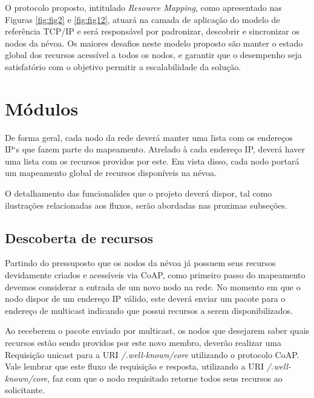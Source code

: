 O protocolo proposto, intitulado \textit{Resource Mapping}, como apresentado nas Figuras \ref{fig:fig2} e \ref{fig:fig12}, atuará na camada de aplicação do modelo de referência TCP/IP \cite{tanenbaum2011redes} e será responsável por padronizar, descobrir e sincronizar os nodos da névoa.
Os maiores desafios neste modelo proposto são manter o estado global dos recursos acessível a todos os nodos, e garantir que o desempenho seja satisfatório com o objetivo permitir a escalabilidade da solução.


\section{Módulos}

De forma geral, cada nodo da rede deverá manter uma lista com os endereços IP`s que fazem parte do mapeamento.
Atrelado à cada endereço IP, deverá haver uma lista com os recursos providos por este.
Em vista disso, cada nodo portará um mapeamento global de recursos disponíveis na névoa.

O detalhamento das funcionalides que o projeto deverá dispor, tal como ilustrações relacionadas aos fluxos, serão abordadas nas proximas subseções.

\subsection{Descoberta de recursos}


Partindo do pressuposto que os nodos da névoa já possuem seus recursos devidamente criados e acessíveis via CoAP,
como primeiro passo do mapeamento devemos considerar a entrada de um novo nodo na rede.
No momento em que o nodo dispor de um endereço IP válido, este deverá enviar um pacote para o endereço de multicast indicando que possui recursos a serem disponibilizados.


Ao receberem o pacote enviado por multicast, os nodos que desejarem saber quais recursos estão sendo providos por este novo membro, deverão realizar uma Requisição
unicast para a URI \textit{/.well-known/core} utilizando o protocolo CoAP.
Vale lembrar que este fluxo de requisição e resposta, utilizando a URI \textit{/.well-known/core}, faz com que o nodo requisitado retorne todos seus recursos ao solicitante.

